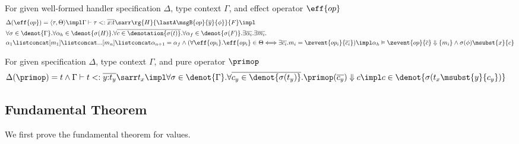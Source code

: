 \begin{lemma}
  \label{lemma:built-in-typing-sub}
For given well-formed handler specification $\Delta$, type context $\Gamma$, and effect operator $\eff{op}$
{\small\begin{align*}
    &\Delta(\eff{op}) = \langle \tau, \Theta \rangle \impl \Gamma \vdash \tau <: \overline{x{:}t} \sarr \rg{H}{\lastA\msgB{op}{\overline{y}}{\phi}}{F} \impl
    \\&\forall \sigma \in \denot{\Gamma}. \forall \alpha_h \in \denot{\sigma(H)}. \forall \overline{c \in \denotation{\sigma(t)}}. \forall \alpha_f \in \denot{\sigma(F)}.
    \exists \overline{\alpha_i}. \exists \overline{m_i}.\;
    \\&\alpha_1 \listconcat [m_1] \listconcat ... [m_{n}] \listconcat \alpha_{n+1} = \alpha_f  \land (\forall \eff{op_i}. \eff{op_i} \in \Theta {\iff} \exists \overline{c_i}.m_i = \zevent{op_i}{\overline{c_i}}) \impl \alpha_h \vDash \zevent{op}{\overline{c}} \Downarrow \{m_i\} \land \sigma(\phi)\msubst{x}{c}
\end{align*}}
\end{lemma}

\begin{lemma}
  \label{lemma:built-in-typing-sub-pure}
For given specification $\Delta$, type context $\Gamma$, and pure operator $\primop$
{\small\begin{align*}
    &\Delta(\primop) = t \land \Gamma \vdash t <: \overline{y{:}t_y}\sarr t_x \impl \forall \sigma \in \denot{\Gamma}. \forall \overline{c_y \in \denot{\sigma(t_y)}}. \primop (\overline{c_y}) \Downarrow c \impl c \in \denot{\sigma(t_x\msubst{y}{c_y})}
\end{align*}}
\end{lemma}

\subsection{Fundamental Theorem}

We first prove the fundamental theorem for values.

